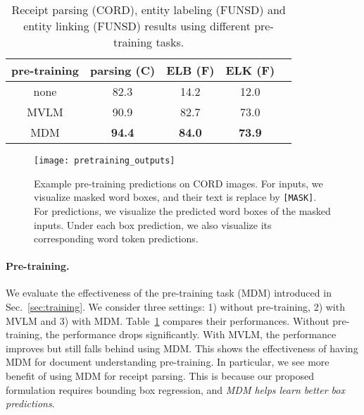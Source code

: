 \begin{table}[!t]
    \centering
    \begin{tabular}{ccccc}
    \bf pre-training            & \bf parsing (C) & \bf ELB (F) & \bf ELK (F) \\
    \midrule
     none                       & 82.3            &  14.2      & 12.0       \\
     MVLM \cite{xu2020layoutlm} & 90.9            &  82.7      & 73.0       \\
     MDM                        & \bf{94.4}       &  \bf 84.0  & \bf 73.9  \\
    \end{tabular}
    \vspace{-0.7em}
    \caption{Receipt parsing (CORD), entity labeling (FUNSD) and entity linking (FUNSD) results using different pre-training tasks.}
    \label{tab:pretraining_tasks} \vspace{-1em}
\end{table}

\begin{figure}[t]
  \centering
  \texttt{[image: pretraining\_outputs]}
  \vspace{-2.1em}
  \caption{Example pre-training predictions on CORD images. For inputs, we visualize masked word boxes, and their text is replace by \texttt{[MASK]}. For predictions, we visualize the predicted word boxes of the masked inputs. Under each box prediction, we also visualize its corresponding word token predictions.}
  \label{fig:pretraining_outputs} \vspace{-1em}
\end{figure}

\vspace{-1em}
\paragraph{Pre-training.} We evaluate the effectiveness of the pre-training task (MDM) introduced in Sec.~\ref{sec:training}. We consider three settings: 1) without pre-training, 2) with MVLM and 3) with MDM. Table~\ref{tab:pretraining_tasks} compares their performances. Without pre-training, the performance drops significantly. With MVLM, the performance improves but still falls behind using MDM. This shows the effectiveness of having MDM for document understanding pre-training. In particular, we see more benefit of using MDM for receipt parsing. This is because our proposed formulation requires bounding box regression, and \textit{MDM helps learn better box predictions}.

